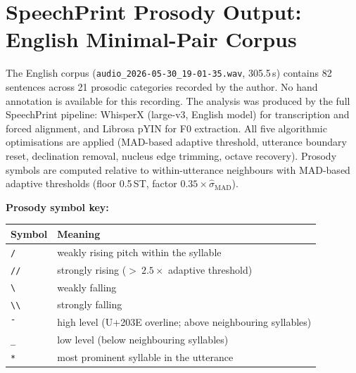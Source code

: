 
\appendix

\chapter{SpeechPrint Prosody Output: English Minimal-Pair Corpus}
\label{app:english}

The English corpus (\texttt{audio\_2026-05-30\_19-01-35.wav}, 305.5\,s) contains
82 sentences across 21 prosodic categories recorded by the author.
No hand annotation is available for this recording.
The analysis was produced by the full SpeechPrint pipeline: WhisperX (large-v3,
English model) for transcription and forced alignment, and Librosa pYIN for F0
extraction. All five algorithmic optimisations are applied (MAD-based adaptive
threshold, utterance boundary reset, declination removal, nucleus edge trimming,
octave recovery). Prosody symbols are computed relative to within-utterance
neighbours with MAD-based adaptive thresholds (floor 0.5\,ST,
factor $0.35 \times \hat{\sigma}_\mathrm{MAD}$).

\medskip\noindent\textbf{Prosody symbol key:}

\begin{center}
\small
\begin{tabular}{ll}
\toprule
Symbol & Meaning \\
\midrule
\texttt{/}   & weakly rising pitch within the syllable \\
\texttt{//}  & strongly rising (${>}\ 2.5\times$ adaptive threshold) \\
\texttt{\textbackslash}  & weakly falling \\
\texttt{\textbackslash\textbackslash} & strongly falling \\
\texttt{{\={}}}  & high level (U+203E overline; above neighbouring syllables) \\
\texttt{\_}  & low level (below neighbouring syllables) \\
\texttt{*}   & most prominent syllable in the utterance \\
\bottomrule
\end{tabular}
\end{center}

